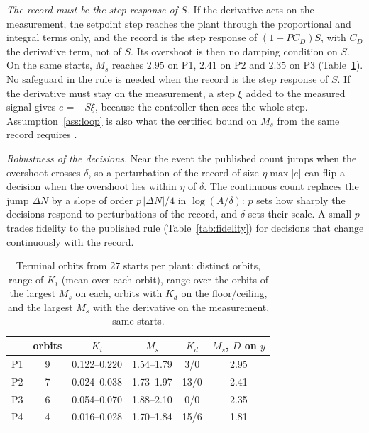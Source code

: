 \documentclass[letterpaper, 10 pt, conference]{ieeeconf}
\begin{document}
\emph{The record must be the step response of $S$.} If the derivative acts on
the measurement, the setpoint step reaches the plant through the proportional
and integral terms only, and the record is the step response of
$(1 + P C_D) S$, with $C_D$ the derivative term, not of $S$. Its overshoot is
then no damping condition on $S$. On the same starts, $M_s$ reaches $2.95$ on
P1, $2.41$ on P2 and $2.35$ on P3 (Table~\ref{tab:battery}). No safeguard in
the rule is needed when the record is the step response of $S$. If the
derivative must stay on the measurement, a step $\xi$ added to the measured
signal gives $e = -S\xi$, because the controller then sees the whole step.
Assumption~\ref{ass:loop} is also what the certified bound on $M_s$ from the
same record requires \cite{Certified}.

\emph{Robustness of the decisions.} Near the event the published count jumps
when the overshoot crosses $\delta$, so a perturbation of the record of size
$\eta \max|e|$ can flip a decision when the overshoot lies within $\eta$ of
$\delta$. The continuous count replaces the jump $\Delta N$ by a slope of order
$p\,|\Delta N|/4$ in $\log(A/\delta)$: $p$ sets how sharply the decisions
respond to perturbations of the record, and $\delta$ sets their scale. A small
$p$ trades fidelity to the published rule (Table~\ref{tab:fidelity}) for
decisions that change continuously with the record.

\begin{table}[t]
\centering\small
\caption{Terminal orbits from $27$ starts per plant: distinct orbits, range of
$K_i$ (mean over each orbit), range over the orbits of the largest $M_s$ on
each, orbits with $K_d$ on the floor/ceiling, and the largest $M_s$ with the
derivative on the measurement, same starts.}
\label{tab:battery}
\setlength{\tabcolsep}{3.2pt}
\begin{tabular}{lccccc}
\toprule
 & orbits & $K_i$ & $M_s$ & $K_d$ & $M_s$, $D$ on $y$ \\
\midrule
P1 & 9 & 0.122--0.220 & 1.54--1.79 & 3/0 & 2.95 \\
P2 & 7 & 0.024--0.038 & 1.73--1.97 & 13/0 & 2.41 \\
P3 & 6 & 0.054--0.070 & 1.88--2.10 & 0/0 & 2.35 \\
P4 & 4 & 0.016--0.028 & 1.70--1.84 & 15/6 & 1.81 \\
\bottomrule
\end{tabular}
\end{table}

\end{document}
